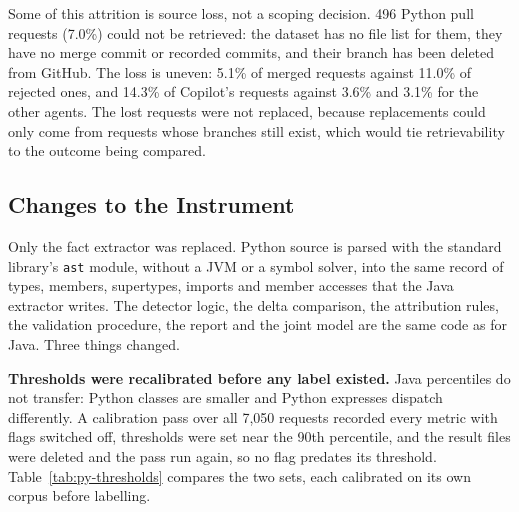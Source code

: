 Some of this attrition is source loss, not a scoping decision. 496 Python pull requests (7.0\%) could
not be retrieved: the dataset has no file list for them, they have no merge commit or recorded
commits, and their branch has been deleted from GitHub. The loss is uneven: 5.1\% of merged requests
against 11.0\% of rejected ones, and 14.3\% of Copilot's requests against 3.6\% and 3.1\% for the
other agents. The lost requests were not replaced, because replacements could only come from requests
whose branches still exist, which would tie retrievability to the outcome being compared.

\subsection{Changes to the Instrument}
\label{sec:python-instrument}

Only the fact extractor was replaced. Python source is parsed with the standard library's
\texttt{ast} module, without a JVM or a symbol solver, into the same record of types, members,
supertypes, imports and member accesses that the Java extractor writes. The detector logic, the delta
comparison, the attribution rules, the validation procedure, the report and the joint model are the
same code as for Java. Three things changed.

\textbf{Thresholds were recalibrated before any label existed.} Java percentiles do not transfer:
Python classes are smaller and Python expresses dispatch differently. A calibration pass over all
7{,}050 requests recorded every metric with flags switched off, thresholds were set near the 90th
percentile, and the result files were deleted and the pass run again, so no flag predates its
threshold. Table~\ref{tab:py-thresholds} compares the two sets, each calibrated on its own corpus before
labelling.

